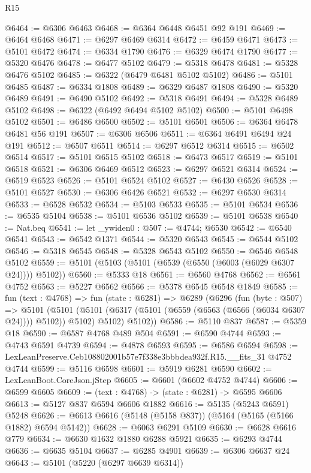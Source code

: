 \begin{lexlean}{R15}
\begin{coremodule}
{{{{{{{{{{{@6464 := @6306 @6463
@6468 := @6364 @6448 @6451 @92 @191
@6469 := @6464 @6468
@6471 := @6297 @6469 @6314
@6472 := @6459 @6471
@6473 := @5101 @6472
@6474 := @6334 @1790
@6476 := @6329 @6474 @1790
@6477 := @5320 @6476
@6478 := @6477 @5102
@6479 := @5318 @6478
@6481 := @5328 @6476 @5102
@6485 := @6322 (@6479 @6481 @5102 @5102)
@6486 := @5101 @6485
@6487 := @6334 @1808
@6489 := @6329 @6487 @1808
@6490 := @5320 @6489
@6491 := @6490 @5102
@6492 := @5318 @6491
@6494 := @5328 @6489 @5102
@6498 := @6322 (@6492 @6494 @5102 @5102)
@6500 := @5101 @6498 @5102
@6501 := @6486 @6500
@6502 := @5101 @6501
@6506 := @6364 @6478 @6481 @56 @191
@6507 := @6306 @6506
@6511 := @6364 @6491 @6494 @24 @191
@6512 := @6507 @6511
@6514 := @6297 @6512 @6314
@6515 := @6502 @6514
@6517 := @5101 @6515 @5102
@6518 := @6473 @6517
@6519 := @5101 @6518
@6521 := @6306 @6469 @6512
@6523 := @6297 @6521 @6314
@6524 := @6519 @6523
@6526 := @5101 @6524 @5102
@6527 := @6430 @6526
@6528 := @5101 @6527
@6530 := @6306 @6426 @6521
@6532 := @6297 @6530 @6314
@6533 := @6528 @6532
@6534 := @5103 @6533
@6535 := @5101 @6534
@6536 := @6535 @5104
@6538 := @5101 @6536 @5102
@6539 := @5101 @6538
@6540 := Nat.beq
@6541 := let _ywiden0 : @507 := @4744; @6530
@6542 := @6540 @6541
@6543 := @6542 @1371
@6544 := @5320 @6543
@6545 := @6544 @5102
@6546 := @5318 @6545
@6548 := @5328 @6543 @5102
@6550 := @6546 @6548 @5102
@6559 := @5101 (@5103 (@5101 (@6539 (@6550 (@6003 (@6029 @6307 @24)))) @5102))
@6560 := @5333 @18
@6561 := @6560 @4768
@6562 := @6561 @4752
@6563 := @5227 @6562
@6566 := @5378 @6545 @6548 @1849
@6585 := fun (text : @4768) =>
  fun (state : @6281) =>
  @6289
    (@6296
      (fun (byte : @507) =>
      @5101
        (@5101 (@5101 (@6317 (@5101 (@6559 (@6563 (@6566 (@6034 @6307 @24)))) @5102)) @5102) @5102)
        @5102))
@6586 := @5110 @837
@6587 := @5359 @18
@6590 := @6587 @4768 @489 @504
@6591 := @6590 @4744
@6593 := @4743 @6591 @4739
@6594 := @4878 @6593
@6595 := @6586 @6594
@6598 := LexLeanPreserve.Ceb108802001b57e7f338e3bbbdea932f.R15.__fits_31 @4752 @4744
@6599 := @5116 @6598
@6601 := @5919 @6281 @6590
@6602 := LexLeanBoot.CoreJson.jStep
@6605 := @6601 (@6602 @4752 @4744)
@6606 := @6599 @6605
@6609 := (text : @4768) -> (state : @6281) -> @6595 @6606
@6613 := @5127 @837 @6594 @6606 @1882
@6616 := @5135 (@5243 @6591) @5248
@6626 := @6613 @6616 (@5148 (@5158 @837)) (@5164 (@5165 (@5166 @1882) @6594 @5142))
@6628 := @6063 @6291 @5109
@6630 := @6628 @6616 @779
@6634 := @6630 @1632 @1880 @6288 @5921
@6635 := @6293 @4744
@6636 := @6635 @5104
@6637 := @6285 @4901
@6639 := @6306 @6637 @24
@6643 := @5101 (@5220 (@6297 @6639 @6314))
}}}}}}}}}}}
\end{coremodule}
\end{lexlean}
